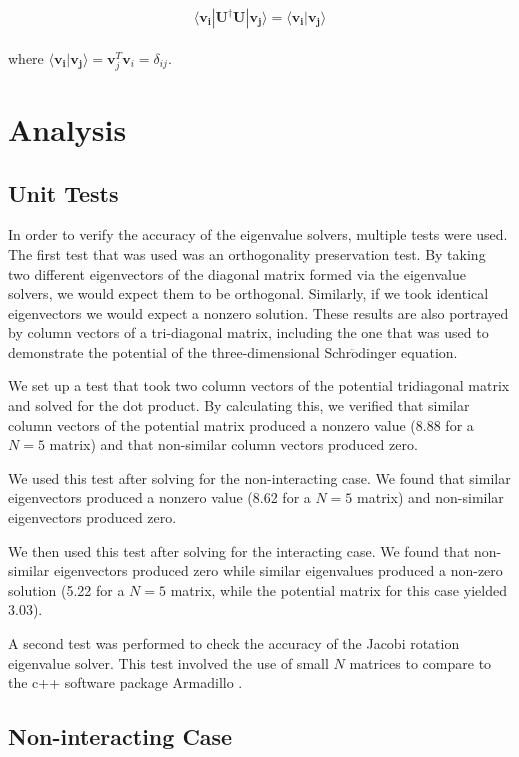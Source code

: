 \documentclass[%
reprint,
superscriptaddress,
showpacs,
nofootinbib,
bibnotes,amsmath,amssymb,aps,
prc, 
]{revtex4-1}
\begin{document}
\begin{equation*}
\langle \boldsymbol{v_{i}}|\boldsymbol{U^\dagger U}|\boldsymbol{v_{j}}\rangle = \langle\boldsymbol{v_{i}|v_{j}} \rangle
\end{equation*}
\\
where $\langle\boldsymbol{v_{i}|v_{j}} \rangle = \mathbf{v}_j^T\mathbf{v}_i = \delta_{ij}.$

	\section{Analysis}
	
	\subsection{Unit Tests}
	In order to verify the accuracy of the eigenvalue solvers, multiple tests were used.  The first test that was used was an orthogonality preservation test.  By taking two different eigenvectors of the diagonal matrix formed via the eigenvalue solvers, we would expect them to be orthogonal.  Similarly, if we took identical eigenvectors we would expect a nonzero solution.  These results are also portrayed by column vectors of a tri-diagonal matrix, including the one that was used to demonstrate the potential of the three-dimensional Schr$\ddot{\textrm{o}}$dinger equation.
	
	We set up a test that took two column vectors of the potential tridiagonal matrix and solved for the dot product.  By calculating this, we verified that similar column vectors of the potential matrix produced a nonzero value (8.88 for a $N=5$ matrix) and that non-similar column vectors produced zero.
	
	We used this test after solving for the non-interacting case.  We found that similar eigenvectors produced a nonzero value (8.62 for a $N=5$ matrix) and non-similar eigenvectors produced zero.
	
	We then used this test after solving for the interacting case.  We found that non-similar eigenvectors produced zero while similar eigenvalues produced a non-zero solution (5.22 for a $N=5$ matrix, while the potential matrix for this case yielded 3.03).
	
	A second test was performed to check the accuracy of the Jacobi rotation eigenvalue solver.  This test involved the use of small $N$ matrices to compare to the c++ software package Armadillo \cite{Armadillo}. 
	
	\subsection{Non-interacting Case}
	
\end{document}
